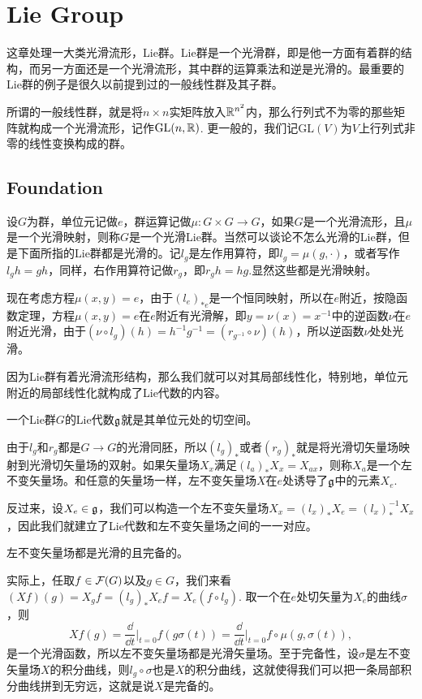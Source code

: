 \chapter{Lie Group}

这章处理一大类光滑流形，Lie群。Lie群是一个光滑群，即是他一方面有着群的结构，而另一方面还是一个光滑流形，其中群的运算乘法和逆是光滑的。最重要的Lie群的例子是很久以前提到过的一般线性群及其子群。

所谓的一般线性群，就是将$n\times n$实矩阵放入$\mathbb{R}^{n^2}$内，那么行列式不为零的那些矩阵就构成一个光滑流形，记作$\mathrm{GL}(n,\mathbb{R})$. 更一般的，我们记$\mathrm{GL}(V)$为$V$上行列式非零的线性变换构成的群。

\section{Foundation}

\para 设$G$为群，单位元记做$e$，群运算记做$\mu:G\times G\to G$，如果$G$是一个光滑流形，且$\mu$是一个光滑映射，则称$G$是一个光滑Lie群。当然可以谈论不怎么光滑的Lie群，但是下面所指的Lie群都是光滑的。记$l_g$是左作用算符，即$l_g=\mu(g,\cdot)$，或者写作$l_gh=gh$，同样，右作用算符记做$r_g$，即$r_gh=hg$.显然这些都是光滑映射。

现在考虑方程$\mu(x,y)=e$，由于$(l_e)_{*e}$是一个恒同映射，所以在$e$附近，按隐函数定理，方程$\mu(x,y)=e$在$e$附近有光滑解，即$y=\nu(x)=x^{-1}$中的逆函数$\nu$在$e$附近光滑，由于$(\nu\circ l_g)(h)=h^{-1}g^{-1}=(r_{g^{-1}}\circ \nu)(h)$，所以逆函数$\nu$处处光滑。

因为Lie群有着光滑流形结构，那么我们就可以对其局部线性化，特别地，单位元附近的局部线性化就构成了Lie代数的内容。

\para 一个Lie群$G$的Lie代数${\mathfrak{g}}$就是其单位元处的切空间。

由于$l_g$和$r_g$都是$G\to G$的光滑同胚，所以$(l_g)_*$或者$(r_g)_*$就是将光滑切矢量场映射到光滑切矢量场的双射。如果矢量场$X_x$满足$(l_a)_*X_x=X_{ax}$，则称$X_a$是一个左不变矢量场。和任意的矢量场一样，左不变矢量场$X$在$e$处诱导了${\mathfrak{g}}$中的元素$X_e$.

反过来，设$X_e\in{\mathfrak{g}}$，我们可以构造一个左不变矢量场$X_x=(l_{x})_*X_e=(l_x)^{-1}_*X_x$，因此我们就建立了Lie代数和左不变矢量场之间的一一对应。

\para 左不变矢量场都是光滑的且完备的。

实际上，任取$f\in\mathcal{F}(G)$以及$g\in G$，我们来看$(Xf)(g)=X_gf=(l_g)_{*}X_ef=X_e(f\circ l_g)$. 取一个在$e$处切矢量为$X_e$的曲线$\sigma$，则
\[
	Xf(g)=\frac{\dd }{\dd t}\bigg|_{t=0}f(g\sigma(t))=\frac{\dd }{\dd t}\bigg|_{t=0}f\circ \mu(g,\sigma(t)),
\]
是一个光滑函数，所以左不变矢量场都是光滑矢量场。至于完备性，设$\sigma$是左不变矢量场$X$的积分曲线，则$l_g\circ \sigma$也是$X$的积分曲线，这就使得我们可以把一条局部积分曲线拼到无穷远，这就是说$X$是完备的。

